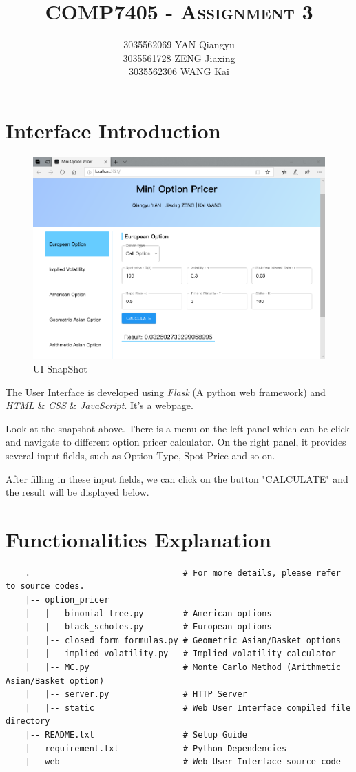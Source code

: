 \documentclass[11pt,a4paper]{article}
\title{\textsc{COMP7405 - Assignment 3}}
\author{	3035562069 YAN Qiangyu\\
                3035561728 ZENG Jiaxing \\
                3035562306 WANG Kai
            }
\date{}
\begin{document}
    \maketitle

    \section{Interface Introduction}
    
    \begin{figure}[h]
    \centering
    \includegraphics[width=\linewidth]{snapshot1}
    \caption{UI SnapShot}
    \end{figure}

    The User Interface is developed using 
    \emph{Flask} (A python web framework) 
    and \emph{HTML} \& \emph{CSS} \& \emph{JavaScript}. 
    It's a webpage.
    

    Look at the snapshot above. There is a menu on the left panel which can
    be click and navigate to different option pricer calculator. On the
    right panel, it provides several input fields, such as Option Type, Spot
    Price and so on.

    After filling in these input fields, we can click on the button
    "CALCULATE" and the result will be displayed below.

    \newpage
    \section{Functionalities Explanation}
    \begin{verbatim}
    .                               # For more details, please refer to source codes.
    |-- option_pricer
    |   |-- binomial_tree.py        # American options
    |   |-- black_scholes.py        # European options
    |   |-- closed_form_formulas.py # Geometric Asian/Basket options
    |   |-- implied_volatility.py   # Implied volatility calculator
    |   |-- MC.py                   # Monte Carlo Method (Arithmetic Asian/Basket option)
    |   |-- server.py               # HTTP Server
    |   |-- static                  # Web User Interface compiled file directory
    |-- README.txt                  # Setup Guide
    |-- requirement.txt             # Python Dependencies
    |-- web                         # Web User Interface source code
    \end{verbatim}
\end{document}
